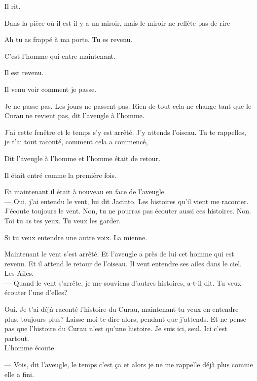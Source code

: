 Il rit.

Dans la pièce où il est il y a un miroir, mais le miroir ne reflète pas
de rire

\clearpage
\thispagestyle{empty}
\movetooddpage

\vspace*{4cm}

Ah tu as frappé à ma porte. Tu es revenu.

C'est l'homme qui entre maintenant.

Il est revenu.

Il venu voir comment je passe.

Je ne passe pas. Les jours ne passent pas. Rien de tout cela ne change
tant que le Curau ne revient pas, dit l'aveugle à l'homme.

J'ai cette fenêtre et le temps s'y est arrêté. J'y attends l'oiseau. Tu
te rappelles, je t'ai tout raconté, comment cela a commencé,

Dit l'aveugle à l'homme et l'homme était de retour.

Il était entré comme la première fois.

Et maintenant il était à nouveau en face de l'aveugle.\\

--- Oui, j'ai entendu le vent, lui dit Jacinto. Les histoires qu'il vient
me raconter. J'écoute toujours le vent. Non, tu ne pourras pas écouter
aussi ces histoires. Non. Toi tu as tes yeux. Tu veux les garder.

Si tu veux entendre une autre voix. La mienne.

\breakk

\vspace*{4cm}

Maintenant le vent s'est arrêté. Et l'aveugle a près de lui cet homme
qui est revenu. Et il attend le retour de l'oiseau. Il veut entendre ses
ailes dans le ciel. Les Ailes.\\

--- Quand le vent s'arrête, je me souviens d'autres histoires, a-t-il dit.
Tu veux écouter l'une d'elles?

Oui. Je t'ai déjà raconté l'histoire du Curau, maintenant tu veux en
entendre plus, toujours plus? Laisse-moi te dire alors, pendant que
j'attends. Et ne pense pas que l'histoire du Curau n'est qu'une
histoire. Je suis ici, seul. Ici c'est partout.\\

L'homme écoute.

--- Vois, dit l'aveugle, le temps c'est ça et alors je ne me rappelle déjà
plus comme elle a fini.

